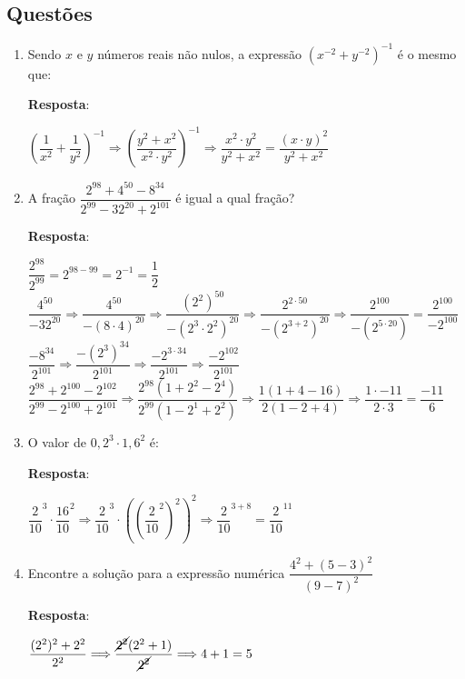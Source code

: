 \subsection{Questões}
\begin{enumerate}[label=\alph*)]
	\item Sendo $ x $ e $ y $ números reais não nulos, a expressão $ (x^{-2} + y^{-2})^{-1} $ é o mesmo que:

	\indent \indent \textbf{Resposta}:
	
	\indent \indent $ (\dfrac{1}{x^{2}} + \dfrac{1}{y^{2}})^{-1} \Longrightarrow (\dfrac{y^{2} + x^{2}}{x^{2}\cdot y^{2}})^{-1} \Longrightarrow \dfrac{x^{2} \cdot y^{2}}{y^{2} + x^{2}} = \dfrac{(x \cdot y)^{2}}{y^{2} + x^{2}} $
	
	\item A fração $ \dfrac{2^{98} + 4^{50} - 8^{34}}{2^{99} - 32^{20} + 2^{101}} $ é igual a qual fração?
	
	\indent \indent \textbf{Resposta}:
	
	\indent \indent $ \dfrac{2^{98}}{2^{99}} = 2^{98 - 99} = 2^{-1} = \dfrac{1}{2} $ \\

	\indent \indent $ \dfrac{4^{50}}{-32^{20}} \Longrightarrow \dfrac{4^{50}}{-(8\cdot 4)^{20}} \Longrightarrow \dfrac{(2^{2})^{50}}{-(2^{3}\cdot 2^{2})^{20}} \Longrightarrow \dfrac{2^{2\cdot 50}}{-(2^{3 + 2})^{20}} \Longrightarrow \dfrac{2^{100}}{-(2^{5\cdot 20})} = \dfrac{2^{100}}{-2^{100}} $ \\
	
	\indent \indent $ \dfrac{-8^{34}}{2^{101}} \Longrightarrow \dfrac{-(2^{3})^{34}}{2^{101}} \Longrightarrow \dfrac{-2^{3\cdot 34}}{2^{101}} \Longrightarrow \dfrac{-2^{102}}{2^{101}} $ \\
	
	\indent \indent $ \dfrac{2^{98} + 2^{100} - 2^{102}}{2^{99} - 2^{100} + 2^{101}} \Longrightarrow \dfrac{2^{98}(1 + 2^{2} - 2^{4})}{2^{99}(1 - 2^{1} + 2^{2})} \Longrightarrow \dfrac{1(1 + 4 - 16)}{2(1 - 2 + 4)} \Longrightarrow \dfrac{1 \cdot -11}{2\cdot 3} = \dfrac{-11}{6}  $
	
	\item O valor de $ 0,2^{3} \cdot 1,6^{2} $ é:
	
	\indent \indent \textbf{Resposta}:

	\indent \indent $ \dfrac{2}{10}^{3} \cdot \dfrac{16}{10}^{2} \Longrightarrow \dfrac{2}{10}^{3} \cdot ((\dfrac{2}{10}^{2})^{2})^{2} \Longrightarrow \dfrac{2}{10}^{3+8} = \dfrac{2}{10}^{11} $ 
	
	\item Encontre a solução para a expressão numérica $ \dfrac{4^{2} + (5 - 3)^{2}}{(9 - 7)^{2}} $
	
	\indent \indent \textbf{Resposta}:
	
	\indent \indent $ \dfrac{(2^{2})^{2} + 2 ^{2}}{2^{2}} \Longrightarrow \dfrac{\cancel{2^{2}}(2^{2} + 1)}{\cancel{2^{2}}} \Longrightarrow 4 + 1 = 5 $

\end{enumerate}
	
